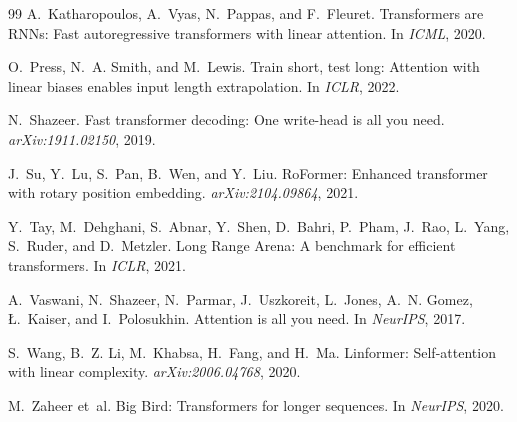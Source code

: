 \documentclass[11pt,a4paper]{article}
\begin{document}
\begin{thebibliography}{99}
A.~Katharopoulos, A.~Vyas, N.~Pappas, and F.~Fleuret.
\newblock Transformers are RNNs: Fast autoregressive transformers with linear
  attention.
\newblock In \emph{ICML}, 2020.

O.~Press, N.~A. Smith, and M.~Lewis.
\newblock Train short, test long: Attention with linear biases enables input
  length extrapolation.
\newblock In \emph{ICLR}, 2022.

N.~Shazeer.
\newblock Fast transformer decoding: One write-head is all you need.
\newblock \emph{arXiv:1911.02150}, 2019.

J.~Su, Y.~Lu, S.~Pan, B.~Wen, and Y.~Liu.
\newblock RoFormer: Enhanced transformer with rotary position embedding.
\newblock \emph{arXiv:2104.09864}, 2021.

Y.~Tay, M.~Dehghani, S.~Abnar, Y.~Shen, D.~Bahri, P.~Pham, J.~Rao, L.~Yang,
  S.~Ruder, and D.~Metzler.
\newblock Long Range Arena: A benchmark for efficient transformers.
\newblock In \emph{ICLR}, 2021.

A.~Vaswani, N.~Shazeer, N.~Parmar, J.~Uszkoreit, L.~Jones, A.~N. Gomez,
  Ł.~Kaiser, and I.~Polosukhin.
\newblock Attention is all you need.
\newblock In \emph{NeurIPS}, 2017.

S.~Wang, B.~Z. Li, M.~Khabsa, H.~Fang, and H.~Ma.
\newblock Linformer: Self-attention with linear complexity.
\newblock \emph{arXiv:2006.04768}, 2020.

M.~Zaheer et~al.
\newblock Big Bird: Transformers for longer sequences.
\newblock In \emph{NeurIPS}, 2020.

\end{thebibliography}
\end{document}
